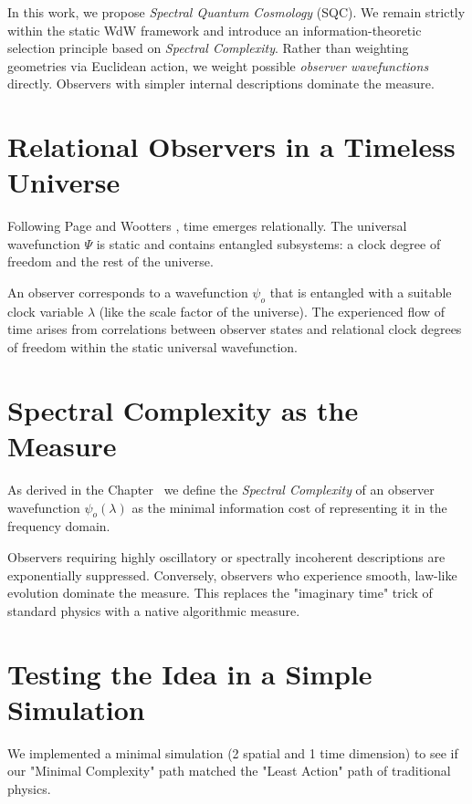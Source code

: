 In this work, we propose \textit{Spectral Quantum Cosmology} (SQC).
We remain strictly within the static WdW framework and introduce an information-theoretic selection principle based on \textit{Spectral Complexity}.
Rather than weighting geometries via Euclidean action, we weight possible \textit{observer wavefunctions} directly.
Observers with simpler internal descriptions dominate the measure.

\section{Relational Observers in a Timeless Universe}

Following Page and Wootters \cite{page1983clock}, time emerges relationally.
The universal wavefunction $\Psi$ is static and contains entangled subsystems: a clock degree of freedom and the rest of the universe.

An observer corresponds to a wavefunction $\psi_o$ that is entangled with a suitable clock variable $\lambda$ (like the scale factor of the universe).
The experienced flow of time arises from correlations between observer states and relational clock degrees of freedom within the static universal wavefunction.

\section{Spectral Complexity as the Measure}

As derived in the Chapter~ we define the \textit{Spectral Complexity} of an observer wavefunction $\psi_o(\lambda)$ as the minimal information cost of representing it in the frequency domain.

Observers requiring highly oscillatory or spectrally incoherent descriptions are exponentially suppressed.
Conversely, observers who experience smooth, law-like evolution dominate the measure.
This replaces the "imaginary time" trick of standard physics with a native algorithmic measure.


\section{Testing the Idea in a Simple Simulation}

We implemented a minimal simulation (2 spatial and 1 time dimension) to see if our "Minimal Complexity" path matched the "Least Action" path of traditional physics.

